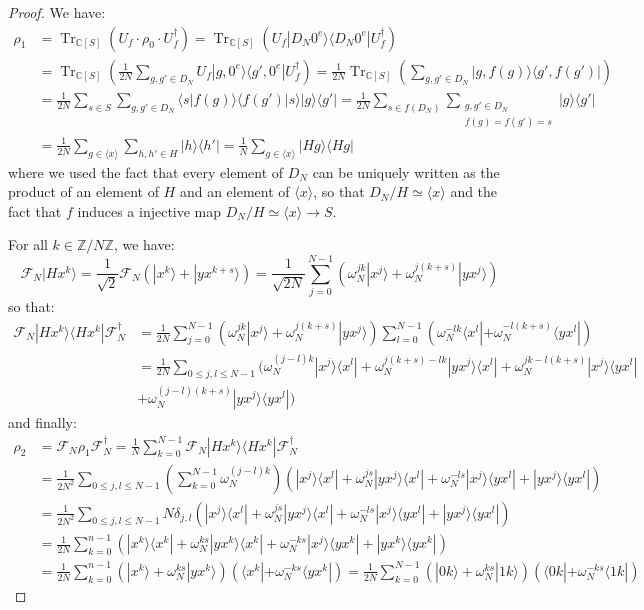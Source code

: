 \documentclass[a4paper,10pt]{report}
\theoremstyle{definition}
\theoremstyle{plain}
\theoremstyle{definition}
\newcommand{\Z}{\mathbb{Z}}
\newcommand{\C}{\mathbb{C}}
\newcommand{\m}[1]{\mathcal{#1}}
\renewcommand{\(}{\left(}
\renewcommand{\)}{\right)}
\DeclareMathOperator{\Tr}{Tr}
\begin{document}
\begin{proof}
We have:
\begin{align*}
\rho_1&=\Tr_{\C[S]}(U_f\cdot \rho_0\cdot U_f^{\dag})=\Tr_{\C[S]}(U_f|D_N0^e\rangle\langle D_N 0^e|U_f^{\dag})\\
&=\Tr_{\C[S]}\(\frac{1}{2N}\sum_{g,g'\in D_N}U_f|g,0^e\rangle\langle g',0^e|U_f^{\dag}\)=\frac{1}{2N}\Tr_{\C[S]}\(\sum_{g,g'\in D_N}|g,f(g)\rangle\langle g',f(g')|\)\\
&=\frac{1}{2N}\sum_{s\in S}\sum_{g,g'\in D_N}\langle s|f(g)\rangle \langle f(g')|s\rangle |g\rangle\langle g'|=\frac{1}{2N}\sum_{s\in f(D_N)}\sum_{\substack{g,g'\in D_N\\f(g)=f(g')=s}}|g\rangle\langle g'|\\
&=\frac{1}{2N}\sum_{g\in \langle x\rangle}\sum_{h,h'\in H}|h\rangle\langle h'|=\frac{1}{N}\sum_{g\in \langle x\rangle}|Hg\rangle\langle Hg|
\end{align*}
where we used the fact that every element of $D_N$ can be uniquely written as the product of an element of $H$ and an element of $\langle x\rangle$, so that $D_N/H\simeq \langle x\rangle$ and the fact that $f$ induces a injective map $D_N/H\simeq \langle x\rangle\longrightarrow S$.

For all $k\in\Z/N\Z$, we have:
\[\m{F}_N|Hx^k\rangle=\frac{1}{\sqrt{2}}\m{F}_N(|x^k\rangle+|yx^{k+s}\rangle)=\frac{1}{\sqrt{2N}}\sum_{j=0}^{N-1}(\omega_N^{jk}|x^j\rangle+\omega_N^{j(k+s)}|yx^j\rangle)\]
so that:
\begin{align*}
\m{F}_N|Hx^k\rangle\langle Hx^k|\m{F}_N^{\dag}&=\frac{1}{2N}\sum_{j=0}^{N-1}(\omega_N^{jk}|x^j\rangle+\omega_N^{j(k+s)}|yx^j\rangle)\sum_{l=0}^{N-1}(\omega_N^{-lk}\langle x^l|+\omega_N^{-l(k+s)}\langle yx^l|)\\
&=\frac{1}{2N}\sum_{0\leq j,l\leq N-1}(\omega_N^{(j-l)k}|x^j\rangle\langle x^l|+\omega_N^{j(k+s)-lk}|yx^j\rangle\langle x^l|+\omega_N^{jk-l(k+s)}|x^j\rangle\langle yx^l|\\
&+\omega_N^{(j-l)(k+s)}|yx^j\rangle\langle yx^l|)
\end{align*}
and finally:
\begin{align*}
\rho_2&=\m{F}_N\rho_1\m{F}_N^{\dag}=\frac{1}{N}\sum_{k=0}^{N-1}\m{F}_N|Hx^k\rangle\langle Hx^k|\m{F}_N^{\dag}\\
&=\frac{1}{2N^2}\sum_{0\leq j,l\leq N-1}\(\sum_{k=0}^{N-1}\omega_N^{(j-l)k}\)\(|x^j\rangle\langle x^l|+\omega_N^{js}|yx^j\rangle\langle x^l|+\omega_N^{-ls}|x^j\rangle\langle yx^l|+|yx^j\rangle\langle yx^l|\)\\
&=\frac{1}{2N^2}\sum_{0\leq j,l\leq N-1}N\delta_{j,l}\(|x^j\rangle\langle x^l|+\omega_N^{js}|yx^j\rangle\langle x^l|+\omega_N^{-ls}|x^j\rangle\langle yx^l|+|yx^j\rangle\langle yx^l|\)\\
&=\frac{1}{2N}\sum_{k=0}^{n-1}\(|x^k\rangle\langle x^k|+\omega_N^{ks}|yx^k\rangle\langle x^k|+\omega_N^{-ks}|x^j\rangle\langle yx^k|+|yx^k\rangle\langle yx^k|\)\\
&=\frac{1}{2N}\sum_{k=0}^{n-1}(|x^k\rangle +\omega_N^{ks}|yx^k\rangle)(\langle x^k|+\omega_N^{-ks}\langle yx^k|)=\frac{1}{2N}\sum_{k=0}^{N-1}(|0k\rangle +\omega_N^{ks}|1k\rangle)(\langle 0k|+\omega_N^{-ks}\langle 1k|)
\end{align*}


\end{proof}
\end{document}
